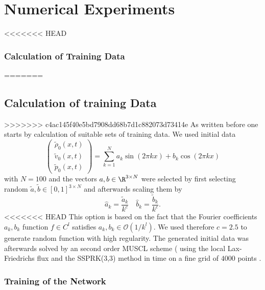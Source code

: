 \section{Numerical Experiments}\label{se_numerics}

<<<<<<< HEAD

	\subsubsection*{Calculation of Training Data}
=======
	\subsection{Calculation of training Data}
>>>>>>> c4ac145f40e5bd7908dd68b7d1c882073d73414e
		As written before one starts by calculation of suitable sets of training data. We used initial data
	\[
		\begin{pmatrix}\tilde \rho_0(x, t)\\ \tilde v_0(x, t) \\ \tilde p_0(x, t) \end{pmatrix} = \sum_{k=1}^{N} a_k \sin(2\pi k x) + b_k\cos(2 \pi k x)
	\]
	with $N = 100$ and the vectors $a, b \in \R^{3 \times N}$ were selected by first selecting random $\tilde a, \tilde b \in [0, 1]^{3 \times N}$ and afterwards scaling them by
	\[
		\hat a_k = \frac {\tilde a_k}{k^{c}}  \quad \hat b_k = \frac{\tilde b_k}{k^c}.
	\]
<<<<<<< HEAD
	This option is based on the fact that the Fourier coefficients $a_k, b_k$ function $f \in C^l$ satisfies $a_k, b_k \in \mathcal O(1/k^l)$. We used therefore $c =2.5$ to generate random function with high regularity. 
	The generated initial data was afterwards solved by an second order MUSCL scheme ( using the local Lax- Friedrichs flux and the SSPRK(3,3) method in time on a fine grid of $4000$ points .
	\subsubsection*{Training of the Network}
